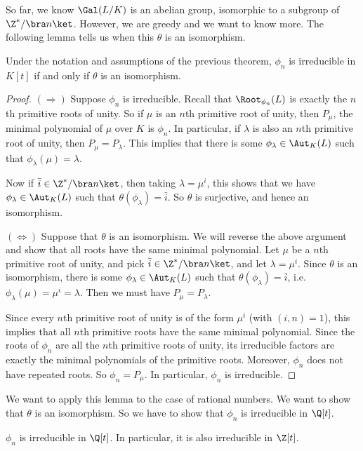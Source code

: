 \documentclass[a4paper]{article}
\begin{document}
So far, we know $\Gal(L/K)$ is an abelian group, isomorphic to a subgroup of $\Z^*/\bra n\ket$. However, we are greedy and we want to know more. The following lemma tells us when this $\theta$ is an isomorphism.

\begin{lemma}
  Under the notation and assumptions of the previous theorem, $\phi_n$ is irreducible in $K[t]$ if and only if $\theta$ is an isomorphism.
\end{lemma}

\begin{proof}
  $(\Rightarrow)$ Suppose $\phi_n$ is irreducible. Recall that $\Root_{\phi_n}(L)$ is exactly the $n$th primitive roots of unity. So if $\mu$ is an $n$th primitive root of unity, then $P_\mu$, the minimal polynomial of $\mu$ over $K$ is $\phi_n$. In particular, if $\lambda$ is also an $n$th primitive root of unity, then $P_\mu = P_\lambda$. This implies that there is some $\phi_\lambda \in \Aut_{K}(L)$ such that $\phi_\lambda(\mu) = \lambda$.

  Now if $\bar{i} \in \Z^*/\bra n\ket$, then taking $\lambda = \mu^i$, this shows that we have $\phi_\lambda \in \Aut_K(L)$ such that $\theta(\phi_\lambda) = \bar{i}$. So $\theta$ is surjective, and hence an isomorphism.

  $(\Leftrightarrow)$ Suppose that $\theta$ is an isomorphism. We will reverse the above argument and show that all roots have the same minimal polynomial. Let $\mu$ be a $n$th primitive root of unity, and pick $\bar{i} \in \Z^*/\bra n\ket$, and let $\lambda = \mu^i$. Since $\theta$ is an isomorphism, there is some $\phi_\lambda \in \Aut_K(L)$ such that $\theta(\phi_\lambda) = \bar{i}$, i.e.\ $\phi_\lambda(\mu) = \mu^i = \lambda$. Then we must have $P_\mu = P_\lambda$.

  Since every $n$th primitive root of unity is of the form $\mu^i$ (with $(i, n) = 1$), this implies that all $n$th primitive roots have the same minimal polynomial. Since the roots of $\phi_n$ are all the $n$th primitive roots of unity, its irreducible factors are exactly the minimal polynomials of the primitive roots. Moreover, $\phi_n$ does not have repeated roots. So $\phi_n = P_\mu$. In particular, $\phi_n$ is irreducible.
\end{proof}

We want to apply this lemma to the case of rational numbers. We want to show that $\theta$ is an isomorphism. So we have to show that $\phi_n$ is irreducible in $\Q[t]$.
\begin{thm}
  $\phi_n$ is irreducible in $\Q[t]$. In particular, it is also irreducible in $\Z[t]$.
\end{thm}
\end{document}

